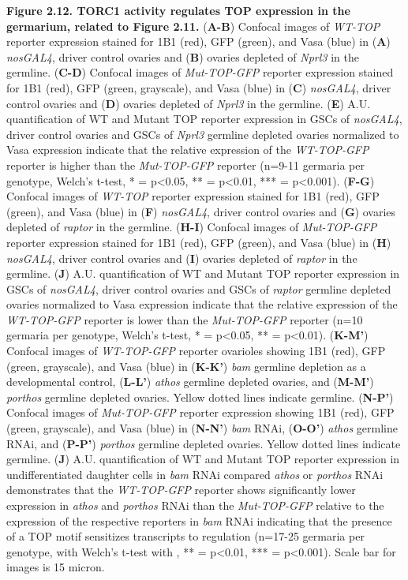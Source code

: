 \documentclass[12pt,oneside]{reedthesis}
\begin{document}
\textbf{Figure 2.12. TORC1 activity regulates TOP expression in the
germarium, related to Figure 2.11.} (\textbf{A-B}) Confocal images of \emph{WT-TOP}
reporter expression stained for 1B1 (red), GFP (green), and Vasa (blue)
in (\textbf{A}) \emph{nosGAL4}, driver control ovaries and (\textbf{B}) ovaries
depleted of \emph{Nprl3} in the germline. (\textbf{C-D}) Confocal images of
\emph{Mut-TOP-GFP} reporter expression stained for 1B1 (red), GFP (green,
grayscale), and Vasa (blue) in (\textbf{C}) \emph{nosGAL4}, driver control ovaries
and (\textbf{D}) ovaries depleted of \emph{Nprl3} in the germline. (\textbf{E}) A.U.
quantification of WT and Mutant TOP reporter expression in GSCs of
\emph{nosGAL4}, driver control ovaries and GSCs of \emph{Nprl3} germline depleted
ovaries normalized to Vasa expression indicate that the relative
expression of the \emph{WT-TOP-GFP} reporter is higher than the \emph{Mut-TOP-GFP}
reporter (n=9-11 germaria per genotype, Welch's t-test, * = p\textless0.05,
** = p\textless0.01, *** = p\textless0.001). (\textbf{F-G}) Confocal images of
\emph{WT-TOP} reporter expression stained for 1B1 (red), GFP (green), and
Vasa (blue) in (\textbf{F}) \emph{nosGAL4}, driver control ovaries and (\textbf{G})
ovaries depleted of \emph{raptor} in the germline. (\textbf{H-I}) Confocal images
of \emph{Mut-TOP-GFP} reporter expression stained for 1B1 (red), GFP (green),
and Vasa (blue) in (\textbf{H}) \emph{nosGAL4}, driver control ovaries and (\textbf{I})
ovaries depleted of \emph{raptor} in the germline. (\textbf{J}) A.U.
quantification of WT and Mutant TOP reporter expression in GSCs of
\emph{nosGAL4}, driver control ovaries and GSCs of \emph{raptor} germline depleted
ovaries normalized to Vasa expression indicate that the relative
expression of the \emph{WT-TOP-GFP} reporter is lower than the \emph{Mut-TOP-GFP}
reporter (n=10 germaria per genotype, Welch's t-test, * = p\textless0.05, **
= p\textless0.01). (\textbf{K-M'}) Confocal images of \emph{WT-TOP-GFP} reporter
ovarioles showing 1B1 (red), GFP (green, grayscale), and Vasa (blue) in
(\textbf{K-K'}) \emph{bam} germline depletion as a developmental control,
(\textbf{L-L'}) \emph{athos} germline depleted ovaries, and (\textbf{M-M'}) \emph{porthos}
germline depleted ovaries. Yellow dotted lines indicate germline.
(\textbf{N-P'}) Confocal images of \emph{Mut-TOP-GFP} reporter expression showing
1B1 (red), GFP (green, grayscale), and Vasa (blue) in (\textbf{N-N'}) \emph{bam}
RNAi, (\textbf{O-O'}) \emph{athos} germline RNAi, and (\textbf{P-P'}) \emph{porthos}
germline depleted ovaries. Yellow dotted lines indicate germline.
(\textbf{J}) A.U. quantification of WT and Mutant TOP reporter expression in
undifferentiated daughter cells in \emph{bam} RNAi compared \emph{athos} or
\emph{porthos} RNAi demonstrates that the \emph{WT-TOP-GFP} reporter shows
significantly lower expression in \emph{athos} and \emph{porthos} RNAi than the
\emph{Mut-TOP-GFP} relative to the expression of the respective reporters in
\emph{bam} RNAi indicating that the presence of a TOP motif sensitizes
transcripts to regulation (n=17-25 germaria per genotype, with Welch's
t-test with , ** = p\textless0.01, *** = p\textless0.001). Scale bar for images
is 15 micron.
\end{document}
